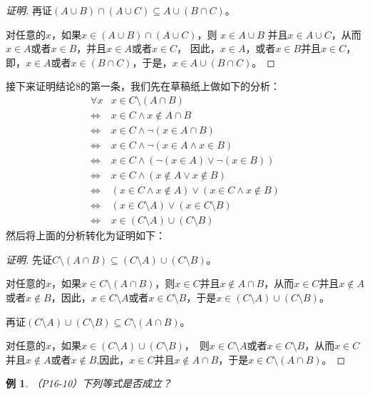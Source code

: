 \documentclass{book}[oneside]
\newtheorem*{Example}{例}
\begin{document}
\begin{CJK*}{UTF8}{gbsn}
\begin{proof}[证明]
  再证$(A \cup B) \cap (A \cup C) \subseteq A \cup (B \cap C)$。

    对任意的$x$，如果$x \in (A \cup B) \cap (A \cup C)$，则 $x \in A \cup B$ 并且$x \in A \cup C$，从而$x \in A$或者$x \in B$，并且$x \in A$或者$ x \in C$，
  因此，$x \in A$，或者$x \in B$并且$ x \in C$，即，$x \in A$或者$x \in (B \cap C)$，于是，$x \in A \cup (B \cap C)$。

\end{proof}
接下来证明结论8的第一条，我们先在草稿纸上做如下的分析：
\begin{equation*}
  \begin{split}
    \forall x &x \in C\setminus (A\cap B)\\
    \Leftrightarrow&x \in C \land x \notin A\cap B\\
    \Leftrightarrow&x \in C \land \lnot (x \in A\cap B)\\
    \Leftrightarrow&x \in C \land \lnot (x \in A \land x \in B)\\
    \Leftrightarrow&x \in C \land (\lnot (x \in A) \lor \lnot (x \in B))\\
    \Leftrightarrow&x \in C \land (x \notin A \lor x \notin B)\\
    \Leftrightarrow&(x \in C \land x \notin A) \lor (x \in C \land x \notin B)\\
    \Leftrightarrow&(x \in C\setminus A)\lor (x\in C\setminus B)\\
    \Leftrightarrow&x \in (C\setminus A) \cup (C \setminus B)
  \end{split}
\end{equation*}
然后将上面的分析转化为证明如下：  
\begin{proof}[证明]
  先证$C\setminus (A\cap B)\subseteq (C\setminus A) \cup (C \setminus B)$。

  对任意的$x$，如果$x \in C\setminus (A\cap B)$，则$x \in C$并且$x \notin A\cap B$，从而$x \in C$并且$x\notin A$或者$x\notin B$，因此，$x\in C\setminus A$或者$x\in C\setminus B$，于是$x\in (C\setminus A) \cup (C \setminus B)$。

  再证$(C\setminus A) \cup (C \setminus B) \subseteq C\setminus (A\cap B)$。

  对任意的$x$，如果$x\in (C\setminus A) \cup (C \setminus B)$，　则$x\in C\setminus A$或者$x\in C\setminus B$，从而$x \in C$并且$x\notin A$或者$x\notin B$,因此，$x \in C$并且$x \notin A\cap B$，于是$x \in C\setminus (A\cap B)$。
\end{proof}
\begin{Example}
  （P16-10）下列等式是否成立？


\end{Example}
\end{CJK*}
\end{document}
